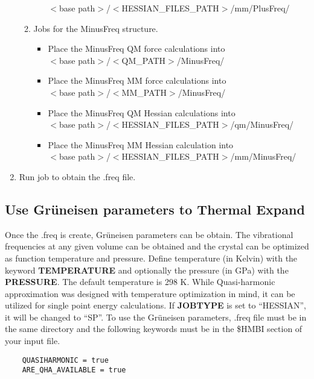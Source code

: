 \documentclass[11pt,letterpaper]{article}
\begin{document}
\begin{spacing}{1.0}
\begin{enumerate}
\begin{enumerate}
\begin{itemize}
            $<$base path$>$/$<$HESSIAN\_FILES\_PATH$>$/mm/PlusFreq/  
        \end{itemize}
      \item Jobs for the MinusFreq structure.
        \begin{itemize}
          \item Place the MinusFreq QM force calculations into \\
            $<$base path$>$/$<$QM\_PATH$>$/MinusFreq/ 
          \item Place the MinusFreq MM force calculations into \\
            $<$base path$>$/$<$MM\_PATH$>$/MinusFreq/   
          \item Place the MinusFreq QM Hessian calculations into \\
            $<$base path$>$/$<$HESSIAN\_FILES\_PATH$>$/qm/MinusFreq/  
          \item Place the MinusFreq MM Hessian calculation into \\
            $<$base path$>$/$<$HESSIAN\_FILES\_PATH$>$/mm/MinusFreq/  
        \end{itemize}
      \end{enumerate}
    \item Run job to obtain the .freq file.

\end{enumerate}


\subsection{Use Gr\"{u}neisen  parameters to Thermal Expand}

Once the .freq is create, Gr\"{u}neisen  parameters can be obtain.
The vibrational frequencies at any given volume can be obtained and the crystal can be optimized as function temperature and pressure.
Define temperature (in Kelvin) with the keyword {\bf TEMPERATURE} and optionally the pressure (in GPa) with the {\bf PRESSURE}.
The default temperature is 298 K. While Quasi-harmonic approximation was designed with temperature optimization in mind, it 
can be utilized for single point energy calculations. If {\bf JOBTYPE} is set to ``HESSIAN'', it will be
changed to ``SP''. To use the Gr\"{u}neisen  parameters, .freq file must be in the same
directory and the following keywords must be in the \$HMBI section of your input file.

\begin{verbatim}
    QUASIHARMONIC = true
    ARE_QHA_AVAILABLE = true
\end{verbatim}


\end{spacing}
\end{document}
